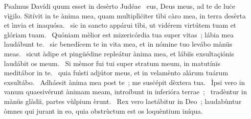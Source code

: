{ Psalmus Davídi quum esset in desèrto Judéae}
{%
~eus, Deus meus, ad te de luċe vìġilo. Sitívit in te ànima mea, quam multiplìċiter tìbi càro mea, in terra desèrta et ìnvia et inaquósa. 
~sic in sancto appárui tìbi, ut vidérem virtútem tuam et glóriam tuam. 
~Quóniam mèlior est mizericórdia tua super vitas~; lábia mea laudábunt te. 
~sic benedícem te in vita mea, et in nómine tuo levábo mànüs meas. 
~sicut àdipe et pingüédine repleátur ànima mea, et lábiïs exsultaçiónis laudábit os meum. 
~Si mèmor fui tui super stratum meum, in matutínïs meditábor in te. 
~quia fuìsti adjútor meus, et in velamènto alárum tuárum exsultábo. 
~Adháesit ànima mea post te~; me susċépit dèxtera tua. 
~Ìpsi vero in vanum quaesivérunt ànimam meam, introíbunt in inferióra terrae~; 
~tradèntur in mànüs glàdii, partes vùlpium èrunt. 
~Rex vero laetábitur in Deo~; laudabùntur òmnes qui jurant in eo, quia obstrùctum est os loquèntium iníqua. 
}
